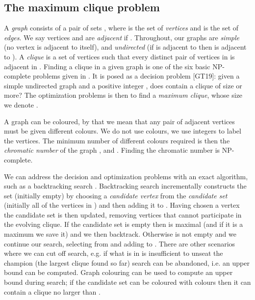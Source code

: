 \documentclass[runningheads]{llncs}
\begin{document}
\subsection{The maximum clique problem}
A \emph{graph}  consists of a pair of sets , where  is the set of \emph{vertices} and  is the set of \emph{edges}. We say vertices  and  are \emph{adjacent} if . Throughout, our graphs are \emph{simple} (no vertex is adjacent to itself), and \emph{undirected} (if  is adjacent to  then  is adjacent to ). A \emph{clique} is a set of vertices  such that every distinct pair of vertices in  is adjacent in .
Finding a clique in a given graph is one of the six basic NP-complete problems given in \cite{gareyJohnson}. It is posed as a decision problem [GT19]: given a simple undirected graph  and a positive integer , does  contain a clique of size  or more? The optimization problems is then to find a \emph{maximum clique}, whose size we denote .


A graph can be coloured, by that we mean that any pair of adjacent vertices must be given different colours. We do not use colours, 
we use integers to label the vertices. The minimum number of different colours required is then the
\emph{chromatic number} of the graph , and . Finding the chromatic number is NP-complete.

We can address the decision and optimization problems with an exact algorithm, 
such as a backtracking search 
\cite{fahle,regin2003,wood97,carraghanPardalos90,pardalosRodgers92,prjo2002,segundo2011,segundo2011b,Konc_Janezic_2007,tomita2003,tomita2010,aaai2010,carmoZuge}.
Backtracking search incrementally constructs the set  (initially empty) by choosing a \emph{candidate vertex}
from  the \emph{candidate set}  (initially all of the vertices in ) and then adding it to . 
Having chosen a vertex the candidate set is then updated, removing vertices
that cannot participate in the evolving clique. If the candidate set is empty then  is maximal (and if it is a maximum we save it)
and we then backtrack. Otherwise  is not empty and we continue our search, selecting from  and adding to .
There are other scenarios where we can cut off search, e.g. if what is in  is insufficient
to unseat the champion (the largest clique found so far) search can be abandoned, i.e. an upper bound can be computed.
Graph colouring can be used to compute an upper
bound during search; if the candidate set can be coloured with  colours then it can contain a clique no larger than 
\cite{wood97,fahle,segundo2011,Konc_Janezic_2007,tomita2003,tomita2010}. 
\end{document}
